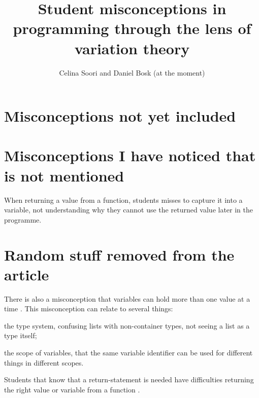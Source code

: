 \documentclass[onecolumn]{article}
\title{Student misconceptions in programming through the lens of variation 
theory}
\author{Celina Soori and Daniel Bosk (at the moment)}
\begin{document}
\maketitle
\newpage
\tableofcontents
\newpage





















\newpage
\printbibliography

\newpage

\appendix

\section{Misconceptions not yet included}




\section{Misconceptions I have noticed that is not mentioned}

When returning a value from a function, students misses to capture it into 
a variable, not understanding why they cannot use the returned value later 
in the programme. 

\section{Random stuff removed from the article}

There is also a misconception that variables can hold more than one value 
at a time \parencite{Doukakis2007}.
This misconception can relate to several things:
\begin{enumerate*}
  \item the type system, confusing lists with non-container types, not 
seeing a 
    list as a type itself;
  \item the scope of variables, that the same variable identifier can be 
used 
    for different things in different scopes.
\end{enumerate*}

Students that know that a return-statement is needed have difficulties 
returning the right value or variable from a function
\parencite{KumarVeerasamy2016}. 
\end{document}
